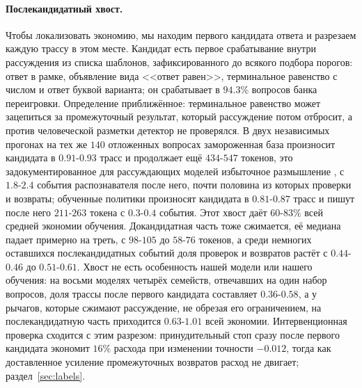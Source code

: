 \documentclass[11pt]{article}
\begin{document}
\paragraph{Послекандидатный хвост.} Чтобы локализовать экономию, мы находим первого кандидата ответа и разрезаем каждую трассу в этом месте. Кандидат есть первое срабатывание внутри рассуждения из списка шаблонов, зафиксированного до всякого подбора порогов: ответ в рамке, объявление вида <<ответ равен>>, терминальное равенство с числом и ответ буквой варианта; он срабатывает в $94.3\%$ вопросов банка переигровки. Определение приближённое: терминальное равенство может зацепиться за промежуточный результат, который рассуждение потом отбросит, а против человеческой разметки детектор не проверялся. В двух независимых прогонах на тех же $140$ отложенных вопросах замороженная база произносит кандидата в $0.91$-$0.93$ трасс и продолжает ещё $434$-$547$ токенов, это задокументированное для рассуждающих моделей избыточное размышление \citep{chen2024donot}, с $1.8$-$2.4$ события распознавателя после него, почти половина из которых проверки и возвраты; обученные политики произносят кандидата в $0.81$-$0.87$ трасс и пишут после него $211$-$263$ токена с $0.3$-$0.4$ события. Этот хвост даёт $60$-$83\%$ всей средней экономии обучения. Докандидатная часть тоже сжимается, её медиана падает примерно на треть, с $98$-$105$ до $58$-$76$ токенов, а среди немногих оставшихся послекандидатных событий доля проверок и возвратов растёт с $0.44$-$0.46$ до $0.51$-$0.61$. Хвост не есть особенность нашей модели или нашего обучения: на восьми моделях четырёх семейств, отвечавших на один набор вопросов, доля трассы после первого кандидата составляет $0.36$-$0.58$, а у рычагов, которые сжимают рассуждение, не обрезая его ограничением, на послекандидатную часть приходится $0.63$-$1.01$ всей экономии. Интервенционная проверка сходится с этим разрезом: принудительный стоп сразу после первого кандидата экономит $16\%$ расхода при изменении точности $-0.012$, тогда как доставленное усиление промежуточных возвратов расход не двигает; раздел~\ref{sec:labels}.
\end{document}
